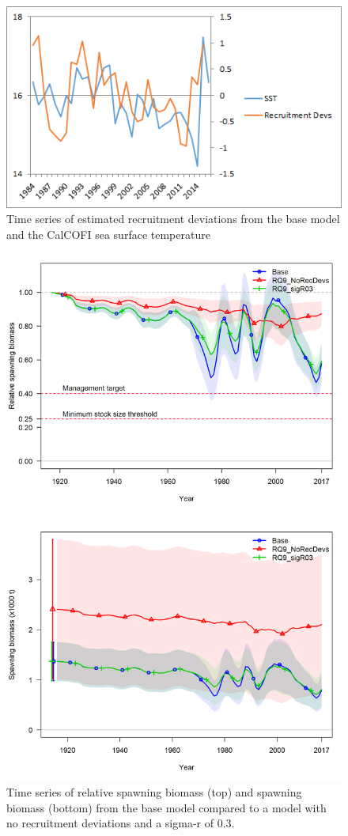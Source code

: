 \documentclass[12pt,]{article}
\begin{document}
\begin{figure}[htbp]
\centering
\includegraphics{Figures/Request8.png}
\caption{Time series of estimated recruitment deviations from the base
model and the CalCOFI sea surface temperature \label{fig:Request8}}
\end{figure}

\begin{figure}[htbp]
\centering
\includegraphics{Figures/Request9.png}
\caption{Time series of relative spawning biomass (top) and spawning
biomass (bottom) from the base model compared to a model with no
recruitment deviations and a sigma-r of 0.3. \label{fig:Request9}}
\end{figure}
\end{document}
